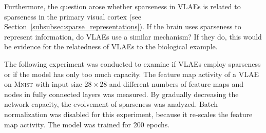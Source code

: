 Furthermore, the question arose whether sparseness in \acp{VLAE} is related to sparseness in the primary visual cortex (see Section~\ref{subsubsec:sparse_representations}).
If the brain uses sparseness to represent information, do \acp{VLAE} use a similar mechanism?
If they do, this would be evidence for the relatedness of \acp{VLAE} to the biological example.

The following experiment was conducted to examine if \acp{VLAE} employ sparseness or if the model has only too much capacity.
The feature map activity of a \ac{VLAE} on \textsc{Mnist} with input size $28\times 28$ and different numbers of feature maps and nodes in fully connected layers was measured.
By gradually decreasing the network capacity, the evolvement of sparseness was analyzed.
Batch normalization was disabled for this experiment, because it re-scales the feature map activity.
The model was trained for 200 epochs.


